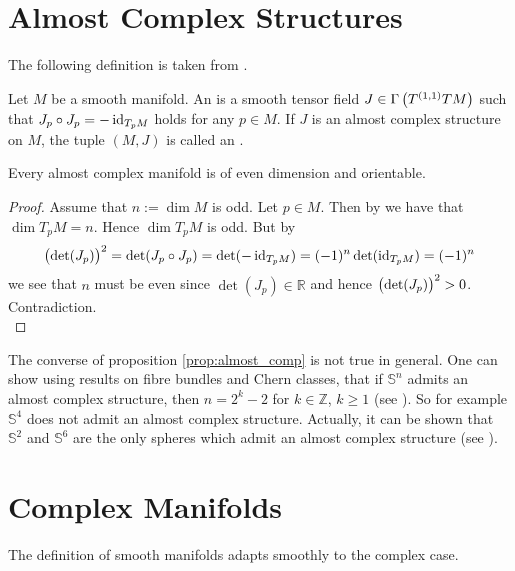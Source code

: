 \section{Almost Complex Structures}
The following definition is taken from \cite[86]{cannas:symplectic_geometry:2008}.
\begin{definition}
Let $M$ be a smooth manifold. An  is a smooth tensor field $J \in \Gamma\del[1]{T^{(1,1)}TM}$ such that $J_p \circ J_p = -\operatorname{id}_{T_pM}$ holds for any $p \in M$. If $J$ is an almost complex structure on $M$, the tuple $(M,J)$ is called an .
\end{definition}

\begin{proposition}
Every almost complex manifold is of even dimension and orientable.
\label{prop:almost_comp}
\end{proposition}

\begin{proof}
Assume that $n := \dim M$ is odd. Let $p \in M$. Then by \cite[57]{lee:smooth_manifolds:2013} we have that $\dim T_p M = n$. Hence $\dim T_pM$ is odd. But by
\begin{equation*}
\del[1]{\det(J_p)}^2 = \det(J_p \circ J_p) = \det(-\id_{T_pM}) = (-1)^n \det(\id_{T_pM}) = (-1)^n
\end{equation*}
\noindent we see that $n$ must be even since $\det(J_p) \in \mathbb{R}$ and hence $\del[1]{\det(J_p)}^2 > 0$. Contradiction.\\
\end{proof}

\begin{remark}
The converse of proposition \ref{prop:almost_comp} is not true in general. One can show using results on fibre bundles and Chern classes, that if $\mathbb{S}^n$ admits an almost complex structure, then $n = 2^k - 2$ for $k \in \mathbb{Z}$, $k \geq 1$ (see \cite[219]{steenrod:topology_fibre:1951}). So for example $\mathbb{S}^4$ does not admit an almost complex structure. Actually, it can be shown that $\mathbb{S}^2$ and $\mathbb{S}^6$ are the only spheres which admit an almost complex structure (see \cite[434]{borel:steenrod:1953}).
\end{remark}

\section{Complex Manifolds}
The definition of smooth manifolds adapts smoothly to the complex case.


